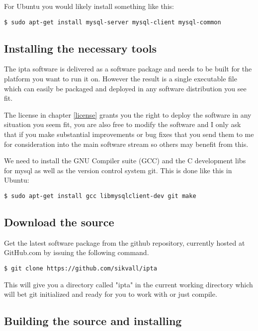 \documentclass[english,twoside,openright,a4paper,12pt]{article}
\begin{document}
For Ubuntu you would likely install something like this:

\small
\begin{verbatim}
$ sudo apt-get install mysql-server mysql-client mysql-common
\end{verbatim}
\normalsize

\subsection{Installing the necessary tools}

The ipta software is delivered as a software package and needs to be
built for the platform you want to run it on. However the result is a
single executable file which can easily be packaged and deployed in
any software distribution you see fit.

The license in chapter \ref{license} grants you the right to deploy
the software in any situation you seem fit, you are also free to
modify the software and I only ask that if you make substantial
improvements or bug fixes that you send them to me for consideration
into the main software stream so others may benefit from this.

We need to install the GNU Compiler suite (GCC) and the C development
libs for mysql as well as the version control system git. This is done
like this in Ubuntu:

\begin{verbatim}
$ sudo apt-get install gcc libmysqlclient-dev git make
\end{verbatim}

\subsection{Download the source}

Get the latest software package from the github repository, currently
hosted at GitHub.com by issuing the following command.

\small
\begin{verbatim}
$ git clone https://github.com/sikvall/ipta
\end{verbatim}
\normalsize

This will give you a directory called "ipta" in the current working
directory which will bet git initialized and ready for you to work
with or just compile.

\subsection{Building the source and installing}
\end{document}
